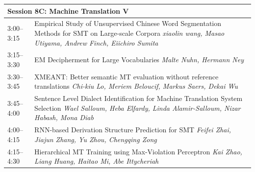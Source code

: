 \documentclass{book}
\renewcommand{\large}{\fontsize{36}{40}\selectfont}
\begin{document}
\begin{tabular}{p{3in}p{16in}}
  \multicolumn{2}{l}{\bfseries\large Session 8C: Machine Translation V} \\\hline

    
    3:00--3:15
    &	Empirical Study of Unsupervised Chinese Word Segmentation Methods for SMT on Large-scale Corpora \newline 
    {\itshape xiaolin wang, Masao Utiyama, Andrew Finch, Eiichiro Sumita} \\
    
    3:15--3:30
    &	EM Decipherment for Large Vocabularies \newline 
    {\itshape Malte Nuhn, Hermann Ney} \\
    
    3:30--3:45
    &	XMEANT: Better semantic MT evaluation without reference translations \newline 
    {\itshape Chi-kiu Lo, Meriem Beloucif, Markus Saers, Dekai Wu} \\
    
    3:45--4:00
    &	Sentence Level Dialect Identification for Machine Translation System Selection \newline 
    {\itshape Wael Salloum, Heba Elfardy, Linda Alamir-Salloum, Nizar Habash, Mona Diab} \\
    
    4:00--4:15
    &	RNN-based Derivation Structure Prediction for SMT \newline 
    {\itshape Feifei Zhai, Jiajun Zhang, Yu Zhou, Chengqing Zong} \\
    
    4:15--4:30
    &	Hierarchical MT Training using Max-Violation Perceptron \newline 
    {\itshape Kai Zhao, Liang Huang, Haitao Mi, Abe Ittycheriah} \\
    
\end{tabular}
\end{document}
